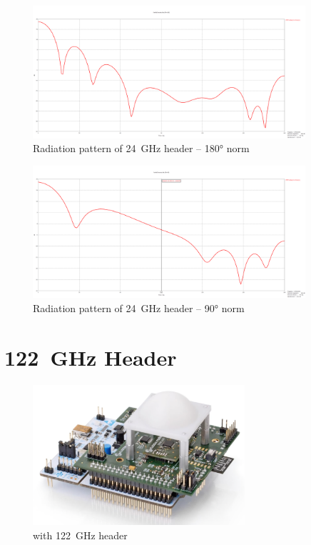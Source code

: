 \begin{figure}[h!]
	\centering
	\includegraphics[width=0.9\textwidth]{../img/farfield180.png}
	\caption[Radiation pattern of 24~GHz header -- 180° norm]{Radiation pattern of 24~GHz header -- 180° norm}
	\label{fig:farfield180}
\end{figure}

\begin{figure}[h!]
	\centering
	\includegraphics[width=0.9\textwidth]{../img/farfield90.png}
	\caption[Radiation pattern of 24~GHz header -- 90° norm]{Radiation pattern of 24~GHz header -- 90° norm}
	\label{fig:farfield90}
\end{figure}


\section{122~GHz Header}

\begin{figure}[h!]
	\centering
	\includegraphics[width=0.7\textwidth]{../img/sidar122.png}
	\caption[\sidar with 122~GHz header \cite{sidarPRO}]{\sidar with 122~GHz header}
	\label{fig:sidar122}
\end{figure}

